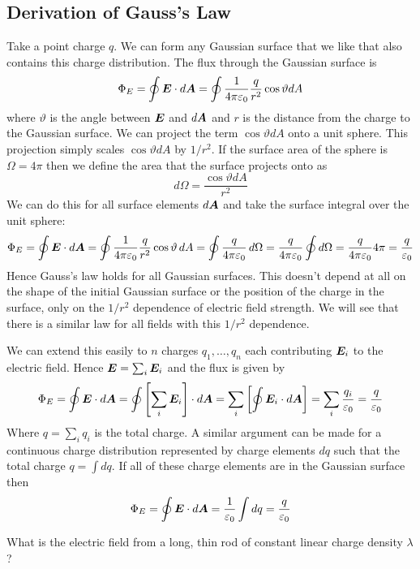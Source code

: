 \documentclass{article}
\begin{document}
    \subsection{Derivation of Gauss's Law}
    Take a point charge \(q\).
    We can form any Gaussian surface that we like that also contains this charge distribution.
    The flux through the Gaussian surface is
    \[\Phi_E = \oint \bm{E}\cdot d\bm{A} = \oint \frac{1}{4\pi\varepsilon_0}\frac{q}{r^2}\cos\vartheta dA\]
    where \(\vartheta\) is the angle between \(\bm{E}\) and \(d\bm{A}\) and \(r\) is the distance from the charge to the Gaussian surface.
    We can project the term \(\cos\vartheta dA\) onto a unit sphere.
    This projection simply scales \(\cos\vartheta dA\) by \(1/r^2\).
    If the surface area of the sphere is \(\Omega = 4\pi\) then we define the area that the surface projects onto as
    \[d\Omega = \frac{\cos\vartheta dA}{r^2}\]
    We can do this for all surface elements \(d\bm{A}\) and take the surface integral over the unit sphere:
    \[\Phi_E = \oint \bm{E}\cdot d\bm{A} = \oint\frac{1}{4\pi\varepsilon_0}\frac{q}{r^2}\cos\vartheta\,dA = \oint\frac{q}{4\pi\varepsilon_0}\,d\Omega = \frac{q}{4\pi\varepsilon_0}\oint d\Omega = \frac{q}{4\pi\varepsilon_0}4\pi = \frac{q}{\varepsilon_0}\]
    Hence Gauss's law holds for all Gaussian surfaces.
    This doesn't depend at all on the shape of the initial Gaussian surface or the position of the charge in the surface, only on the \(1/r^2\) dependence of electric field strength.
    We will see that there is a similar law for all fields with this \(1/r^2\) dependence.
    
    We can extend this easily to \(n\) charges \(q_1,\dotsc,q_n\) each contributing \(\bm{E}_i\) to the electric field.
    Hence \(\bm{E} = \sum_i \bm{E}_i\) and the flux is given by
    \[\Phi_E = \oint\bm{E}\cdot d\bm{A} = \oint \left[\sum_i \bm{E}_i\right]\cdot d\bm{A} = \sum_i\left[\oint \bm{E}_i\cdot d\bm{A}\right] = \sum_i\frac{q_i}{\varepsilon_0} = \frac{q}{\varepsilon_0}\]
    Where \(q = \sum_i q_i\) is the total charge.
    A similar argument can be made for a continuous charge distribution represented by charge elements \(dq\) such that the total charge \(q = \int dq\).
    If all of these charge elements are in the Gaussian surface then
    \[\Phi_E = \oint\bm{E}\cdot d\bm{A} = \frac{1}{\varepsilon_0}\int dq = \frac{q}{\varepsilon_0}\]
    
    \example
    What is the electric field from a long, thin rod of constant linear charge density \(\lambda\)?
    
\end{document}
